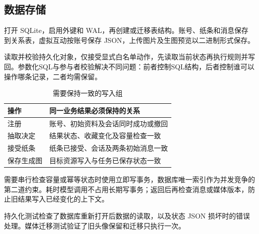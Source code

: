 \subsection*{数据存储}
打开 SQLite，启用外键和 WAL，再创建或迁移表结构。账号、纸条和消息保存到关系表，虚拟互动按账号保存 JSON，上传图片及生图预览以二进制形式保存。

读取并校验持久化对象，仅接受显式白名单动作，先读取当前状态再执行规则并写回。参数化SQL与参与者校验解决不同问题：前者控制SQL结构，后者控制谁可以操作哪条记录，二者均需保留。

\begin{table}[H]\centering\small
\caption{需要保持一致的写入组}
\begin{tabularx}{\linewidth}{@{}p{29mm}X@{}}\toprule
操作 & 同一业务结果必须保持的关系 \\ \midrule
注册 & 账号、初始资料及会话同时成功或撤回 \\
抽取决定 & 结果状态、收藏变化及容量检查一致 \\
接受纸条 & 纸条已接受、会话及两条初始消息一致 \\
保存生成图 & 目标资源写入与任务已保存状态一致 \\ \bottomrule
\end{tabularx}\end{table}

需要串行检查容量或幂等状态时使用立即写事务，数据库唯一索引作为并发竞争的第二道约束。耗时模型调用不占用长期写事务；返回后再检查消息或媒体版本，防止旧结果写入已经变化的上下文。

持久化测试检查了数据库重新打开后数据的读取，以及状态 JSON 损坏时的错误处理。媒体迁移测试验证了旧头像保留和迁移只执行一次。
